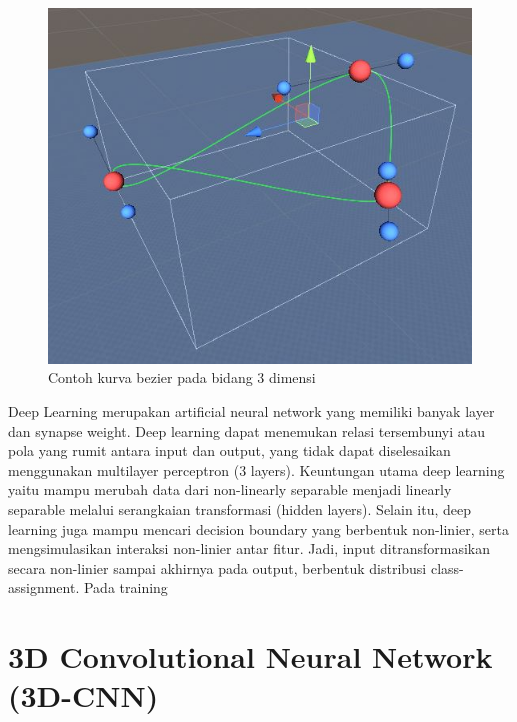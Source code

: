 \begin{figure} [H]
	\captionsetup{justification=centering}
	\includegraphics[scale=0.2]{img/contoh-kurva-bezier.JPG}
	\caption{Contoh kurva bezier pada bidang 3 dimensi}
	\label{fig:2.1}
\end{figure}

Deep Learning merupakan artificial neural network yang memiliki banyak layer dan synapse weight. Deep learning dapat menemukan relasi tersembunyi atau pola yang rumit antara input dan
output, yang tidak dapat diselesaikan menggunakan multilayer perceptron (3 layers). Keuntungan utama deep learning yaitu mampu
merubah data dari non-linearly separable menjadi linearly separable
melalui serangkaian transformasi (hidden layers). Selain itu, deep
learning juga mampu mencari decision boundary yang berbentuk
non-linier, serta mengsimulasikan interaksi non-linier antar fitur.
Jadi, input ditransformasikan secara non-linier sampai akhirnya pada output, berbentuk distribusi class-assignment. Pada training
\vspace{1ex}

\section{3D Convolutional Neural Network (3D-CNN)}
\vspace{1ex}

